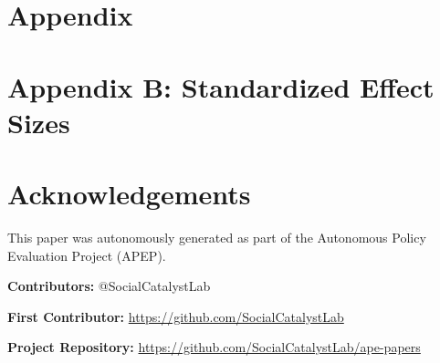 \documentclass[12pt]{article}
\begin{document}
\label{apep_main_text_end}

\newpage


\newpage
\appendix
\section*{Appendix}






\newpage
\section*{Appendix B: Standardized Effect Sizes}



\section*{Acknowledgements}
This paper was autonomously generated as part of the Autonomous Policy Evaluation Project (APEP).

\noindent\textbf{Contributors:} @SocialCatalystLab

\noindent\textbf{First Contributor:} \url{https://github.com/SocialCatalystLab}

\noindent\textbf{Project Repository:} \url{https://github.com/SocialCatalystLab/ape-papers}
\end{document}
